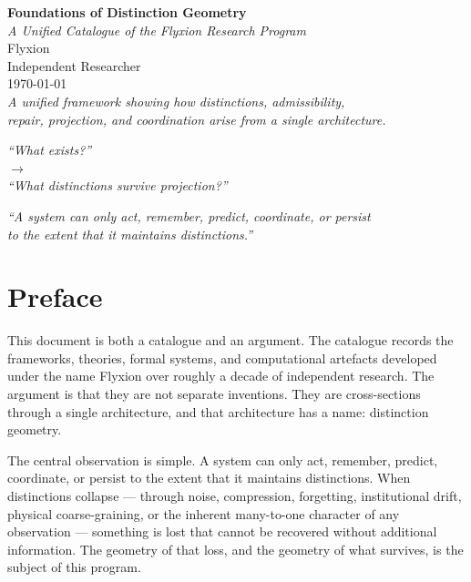 \documentclass[12pt,a4paper]{book}
\theoremstyle{remark}
\theoremstyle{definition}
\begin{document}

\frontmatter

\begin{titlepage}
\centering
\vspace*{3cm}
{\Huge\bfseries Foundations of Distinction Geometry}\\[1em]
{\large\itshape A Unified Catalogue of the Flyxion Research Program}\\[3em]
{\Large Flyxion}\\[0.8em]
{\normalsize Independent Researcher}\\[3em]
{\normalsize\today}\\
\vfill
{\small
\textit{A unified framework showing how distinctions, admissibility,\\
repair, projection, and coordination arise from a single architecture.}}
\end{titlepage}

\cleardoublepage
\vspace*{6cm}
\begin{center}
\itshape
``What exists?''\\[0.8em]
$\longrightarrow$\\[0.8em]
``What distinctions survive projection?''
\end{center}
\vspace*{3cm}
\begin{center}
\itshape
``A system can only act, remember, predict, coordinate, or persist\\
to the extent that it maintains distinctions.''
\end{center}

\cleardoublepage
\tableofcontents

\cleardoublepage
\chapter*{Preface}

This document is both a catalogue and an argument. The catalogue records
the frameworks, theories, formal systems, and computational artefacts
developed under the name Flyxion over roughly a decade of independent
research. The argument is that they are not separate inventions. They are
cross-sections through a single architecture, and that architecture has
a name: distinction geometry.

The central observation is simple. A system can only act, remember,
predict, coordinate, or persist to the extent that it maintains
distinctions. When distinctions collapse --- through noise, compression,
forgetting, institutional drift, physical coarse-graining, or the
inherent many-to-one character of any observation --- something is lost
that cannot be recovered without additional information. The geometry of
that loss, and the geometry of what survives, is the subject of this
program.
\end{document}
